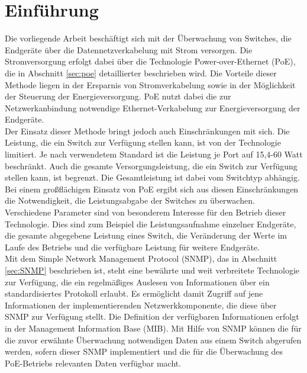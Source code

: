 \section{Einführung}
\label{sec:intro}
Die vorliegende Arbeit beschäftigt sich mit der Überwachung von Switches, die Endgeräte über die Datennetzverkabelung mit Strom versorgen. Die Stromversorgung erfolgt dabei über die Technologie Power-over-Ethernet (PoE), die in Abschnitt \ref{sec:poe} detaillierter beschrieben wird. Die Vorteile dieser Methode liegen in der Ersparnis von Stromverkabelung sowie in der Möglichkeit der Steuerung der Energieversorgung. PoE nutzt dabei die zur Netzwerkanbindung notwendige Ethernet-Verkabelung zur Energieversorgung der Endgeräte.
\\

Der Einsatz dieser Methode bringt jedoch auch Einschränkungen mit sich. Die Leistung, die ein Switch zur Verfügung stellen kann, ist von der Technologie limitiert. Je nach verwendetem Standard ist die Leistung je Port auf 15,4-60 Watt beschränkt. Auch die gesamte Versorgungsleistung, die ein Switch zur Verfügung stellen kann, ist begrenzt. Die Gesamtleistung ist dabei vom Switchtyp abhängig. 
\\

Bei einem großflächigen Einsatz von PoE ergibt sich aus diesen Einschränkungen die Notwendigkeit, die Leistungsabgabe der Switches zu überwachen. Verschiedene Parameter sind von besonderem Interesse für den Betrieb dieser Technologie. Dies sind zum Beispiel die Leistungsaufnahme einzelner Endgeräte, die gesamte abgegebene Leistung eines Switch, die Veränderung der Werte im Laufe des Betriebs und die verfügbare Leistung für weitere Endgeräte.
\\

Mit dem Simple Network Management Protocol (SNMP), das in Abschnitt \ref{sec:SNMP} beschrieben ist, steht eine bewährte und weit verbreitete Technologie zur Verfügung, die ein regelmäßiges Auslesen von Informationen über ein standardisiertes Protokoll erlaubt. Es ermöglicht damit Zugriff auf jene Informationen der implementierenden Netzwerkkomponente, die diese über SNMP zur Verfügung stellt. Die Definition der verfügbaren Informationen erfolgt in der Management Information Base (MIB). Mit Hilfe von SNMP können die für die zuvor erwähnte Überwachung notwendigen Daten aus einem Switch abgerufen werden, sofern dieser SNMP implementiert und die für die Überwachung des PoE-Betriebs relevanten Daten verfügbar macht.
\\

